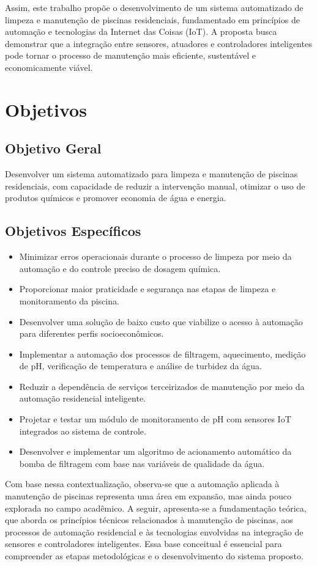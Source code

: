 Assim, este trabalho propõe o desenvolvimento de um sistema automatizado de limpeza e manutenção de piscinas residenciais, fundamentado em princípios de automação e tecnologias da Internet das Coisas (IoT). A proposta busca demonstrar que a integração entre sensores, atuadores e controladores inteligentes pode tornar o processo de manutenção mais eficiente, sustentável e economicamente viável.



\section{Objetivos}


\subsection{Objetivo Geral}

Desenvolver um sistema automatizado para limpeza e manutenção de piscinas residenciais, com capacidade de reduzir a intervenção manual, otimizar o uso de produtos químicos e promover economia de água e energia. 
  
\subsection{Objetivos Específicos}

\begin{itemize}
\item Minimizar erros operacionais durante o processo de limpeza por meio da automação e do controle preciso de dosagem química.
\item Proporcionar maior praticidade e segurança nas etapas de limpeza e monitoramento da piscina.
\item Desenvolver uma solução de baixo custo que viabilize o acesso à automação para diferentes perfis socioeconômicos.
\item Implementar a automação dos processos de filtragem, aquecimento, medição de pH, verificação de temperatura e análise de turbidez da água.
\item Reduzir a dependência de serviços terceirizados de manutenção por meio da automação residencial inteligente.
\item Projetar e testar um módulo de monitoramento de pH com sensores IoT integrados ao sistema de controle.
\item Desenvolver e implementar um algoritmo de acionamento automático da bomba de filtragem com base nas variáveis de qualidade da água.
\end{itemize}

Com base nessa contextualização, observa-se que a automação aplicada à manutenção de piscinas representa uma área em expansão, mas ainda pouco explorada no campo acadêmico. A seguir, apresenta-se a fundamentação teórica, que aborda os princípios técnicos relacionados à manutenção de piscinas, aos processos de automação residencial e às tecnologias envolvidas na integração de sensores e controladores inteligentes. Essa base conceitual é essencial para compreender as etapas metodológicas e o desenvolvimento do sistema proposto.
